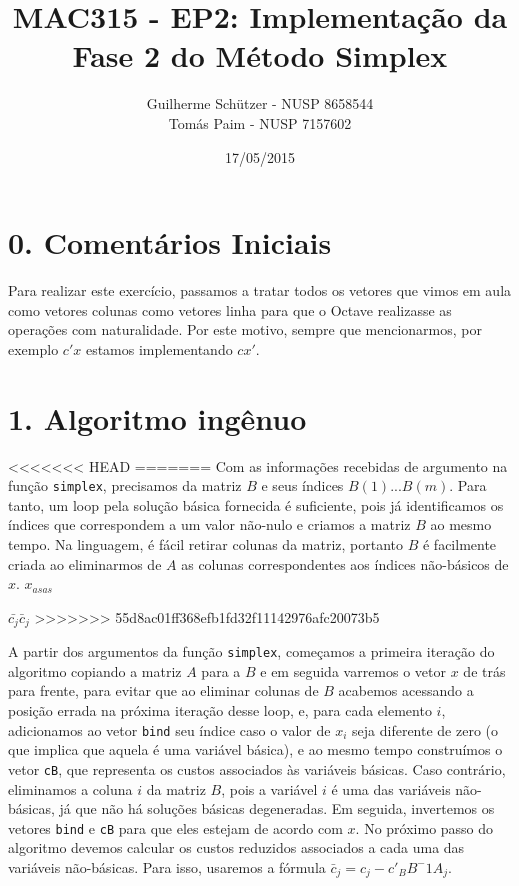 \documentclass[a4paper]{article}
\title{MAC315 - EP2: Implementação da Fase 2 do Método Simplex}
\author{
	Guilherme Schützer - NUSP 8658544 \\
	Tomás Paim         - NUSP 7157602
}
\date{17/05/2015}
\begin{document}
\maketitle

\section{0. Comentários Iniciais}

Para realizar este exercício, passamos a tratar todos os vetores que vimos em aula como vetores colunas como vetores linha para que o Octave realizasse as operações com naturalidade. Por este motivo, sempre que mencionarmos, por exemplo $c'x$ estamos implementando $cx'$.

\section{1. Algoritmo ingênuo}
<<<<<<< HEAD
=======
Com as informações recebidas de argumento na função \texttt{simplex}, precisamos da matriz $B$ e seus índices $B(1)...B(m)$. Para tanto, um loop pela solução básica fornecida é suficiente, pois já identificamos os índices que correspondem a um valor não-nulo e criamos a matriz $B$ ao mesmo tempo. Na linguagem, é fácil retirar colunas da matriz, portanto $B$ é facilmente criada ao eliminarmos de $A$ as colunas correspondentes aos índices não-básicos de $x$. $x_{asas}$

$\bar{c_{j}} \bar{c}_{j}$
>>>>>>> 55d8ac01ff368efb1fd32f11142976afc20073b5

A partir dos argumentos da função \texttt{simplex}, começamos a primeira iteração do algoritmo copiando a matriz $A$ para a $B$ e em seguida varremos o vetor $x$ de trás para frente, para evitar que ao eliminar colunas de $B$ acabemos acessando a posição errada na próxima iteração desse loop, e, para cada elemento $i$, adicionamos ao vetor \texttt{bind} seu índice caso o valor de $x_{i}$ seja diferente de zero (o que implica que aquela é uma variável básica), e ao mesmo tempo construímos o vetor \texttt{cB}, que representa os custos associados às variáveis básicas. Caso contrário, eliminamos a coluna $i$ da matriz $B$, pois a variável $i$ é uma das variáveis não-básicas, já que não há soluções básicas degeneradas. Em seguida, invertemos os vetores \texttt{bind} e \texttt{cB} para que eles estejam de acordo com $x$.
No próximo passo do algoritmo devemos calcular os custos reduzidos associados a cada uma das variáveis não-básicas. Para isso, usaremos a fórmula \begin{math}\bar{c}_{j} = c_{j} - c'_{B}B^-1A_{j}\end{math}.
\end{document}
